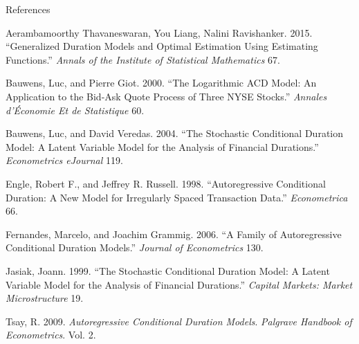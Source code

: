 \documentclass[
  ignorenonframetext,
]{beamer}
\newlength{\cslhangindent}
\newlength{\cslentryspacingunit} %
\newenvironment{CSLReferences}[2] %
 {%
  \setlength{\parindent}{0pt}
  \ifodd #1
  \let\oldpar\par
  \def\par{\hangindent=\cslhangindent\oldpar}
  \fi
  \setlength{\parskip}{#2\cslentryspacingunit}
 }%
 {}
\begin{document}
\begin{frame}[allowframebreaks]{References}
\protect\hypertarget{references}{}
\hypertarget{refs}{}
\begin{CSLReferences}{1}{0}
\leavevmode{}%
Aerambamoorthy Thavaneswaran, You Liang, Nalini Ravishanker. 2015.
{``Generalized Duration Models and Optimal Estimation Using Estimating
Functions.''} \emph{Annals of the Institute of Statistical Mathematics}
67.

\leavevmode{}%
Bauwens, Luc, and Pierre Giot. 2000. {``The Logarithmic ACD Model: An
Application to the Bid-Ask Quote Process of Three NYSE Stocks.''}
\emph{Annales d'Économie Et de Statistique} 60.

\leavevmode{}%
Bauwens, Luc, and David Veredas. 2004. {``The Stochastic Conditional
Duration Model: A Latent Variable Model for the Analysis of Financial
Durations.''} \emph{Econometrics eJournal} 119.

\leavevmode{}%
Engle, Robert F., and Jeffrey R. Russell. 1998. {``Autoregressive
Conditional Duration: A New Model for Irregularly Spaced Transaction
Data.''} \emph{Econometrica} 66.

\leavevmode{}%
Fernandes, Marcelo, and Joachim Grammig. 2006. {``A Family of
Autoregressive Conditional Duration Models.''} \emph{Journal of
Econometrics} 130.

\leavevmode{}%
Jasiak, Joann. 1999. {``The Stochastic Conditional Duration Model: A
Latent Variable Model for the Analysis of Financial Durations.''}
\emph{Capital Markets: Market Microstructure} 19.

\leavevmode{}%
Tsay, R. 2009. \emph{Autoregressive Conditional Duration Models}.
\emph{Palgrave Handbook of Econometrics}. Vol. 2.

\end{CSLReferences}
\end{frame}
\end{document}
